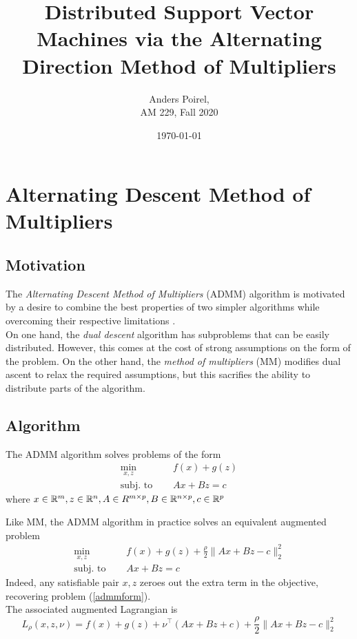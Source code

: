 \documentclass[11pt]{article}
\author{Anders Poirel, \\ AM 229, Fall 2020}
\date{\today}
\title{
    Distributed Support Vector Machines via the Alternating Direction Method of Multipliers
}
\begin{document}
\maketitle 

\section{Alternating Descent Method of Multipliers}

\subsection{Motivation}

The \emph{Alternating Descent Method of Multipliers} (ADMM) algorithm is motivated by a 
desire to combine the best properties of two simpler algorithms while overcoming 
their respective limitations \cite{boydistributed}. \\
On one hand, the \emph{dual descent} algorithm has subproblems that can be easily distributed. 
However, this comes at the cost of strong assumptions on the form of the problem. 
On the other hand, the \emph{method of multipliers} (MM) modifies dual ascent to relax the required assumptions, but this sacrifies the ability to distribute parts of the algorithm. 

\subsection{Algorithm}

The ADMM algorithm solves problems of the form
\begin{equation} \label{admmform}
\begin{aligned}
    \min_{x, z} \quad & f(x) + g(z) \\
    \textrm{subj. to } \quad & Ax + Bz = c
\end{aligned}
\end{equation}
where $x \in \mathbb{R}^m, z \in \mathbb{R}^n, A \in R^{m \times p}, B \in \mathbb{R}^{n \times p}, c \in \mathbb{R}^p$

Like MM, the ADMM algorithm in practice solves an equivalent augmented problem 
\begin{equation} \label{admm_aug_form}
    \begin{aligned}
        \min_{x, z} \quad & f(x) + g(z) + \frac{\rho}{2} \|Ax + Bz - c\|_2^2\\
        \textrm{subj. to } \quad & Ax + Bz = c
    \end{aligned}
    \end{equation}
Indeed, any satisfiable pair $x,z$ zeroes out the extra term in the objective, 
recovering problem (\ref{admmform}). \\
The associated augmented Lagrangian is
\[
    L_{\rho}(x,z,\nu) =  f(x) + g(z) + \nu^\top(Ax+Bz+c) + \frac{\rho}{2} \|Ax + Bz - c\|_2^2
\]
\end{document}
